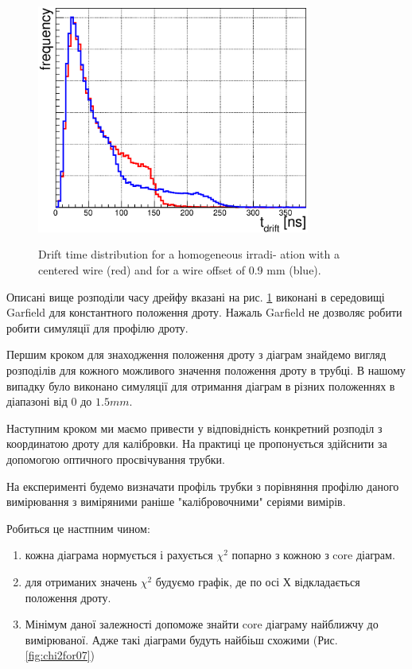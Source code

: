 \documentclass[]{article}
\begin{document}
	\begin{figure}
	\centering
	\includegraphics[width=0.8\textwidth]{00_09_driftTimeDistr}
	\label{fig:DrftTimeDistr_00_09_comp}
	\caption{Drift time distribution for a homogeneous irradi-
ation with a centered wire (red) and for a wire offset of 0.9 mm (blue).}
	\end{figure}
	
	Описані вище розподіли часу дрейфу вказані на рис. \ref{fig:DrftTimeDistr_00_09_comp} виконані в середовищі Garfield для константного положення дроту. Нажаль Garfield не дозволяє робити робити симуляції для  профілю дроту.

	Першим кроком для знаходження положення дроту з діаграм знайдемо вигляд розподілів для кожного можливого значення положення дроту в трубці. В нашому випадку було виконано симуляції для отримання діаграм в різних положеннях в діапазоні від $0$ до $1.5 mm$.

	Наступним кроком ми маємо привести у відповідність конкретний розподіл з координатою дроту для калібровки. На практиці це пропонується здійснити за допомогою оптичного просвічування трубки.
	
	На експерименті будемо визначати профіль трубки з порівняння профілю даного вимірювання з виміряними раніше "калібровочними" серіями вимірів.
	
	Робиться це настпним чином:
	\begin{enumerate}
		\item кожна діаграма нормується і рахується $\chi^2$ попарно з кожною з core діаграм. 
		\item для отриманих значень $\chi^2$ будуємо графік, де по осі Х відкладається положення дроту.
		\item Мінімум даної залежності допоможе знайти core діаграму найближчу до вимірюваної. Адже такі діаграми будуть найбіьш схожими (Рис. \ref{fig:chi2for07})
	\end{enumerate}
	
\end{document}
